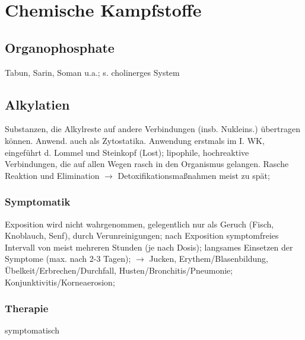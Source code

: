 \documentclass[10pt,a4paper]{report}
\begin{document}
\section{Chemische Kampfstoffe} %
\label{sec:chemische_kampfstoffe}
\subsection{Organophosphate} %
\label{sub:organophosphate}
Tabun, Sarin, Soman u.a.; s. cholinerges System
\subsection{Alkylatien} %
\label{sub:alkylatien}
Substanzen, die Alkylreste auf andere Verbindungen (insb. Nukleins.) übertragen können. Anwend. auch als Zytostatika. Anwendung erstmals im I. WK, eingeführt d. Lommel und Steinkopf (Lost); lipophile, hochreaktive Verbindungen, die auf  allen Wegen rasch in den Organismus gelangen. Rasche Reaktion und Elimination $\rightarrow$ Detoxifikationsmaßnahmen meist zu spät;
\subsubsection{Symptomatik} %
\label{ssub:symptomatik}
Exposition wird nicht wahrgenommen, gelegentlich nur als Geruch (Fisch, Knoblauch, Senf), durch Verunreinigungen; nach Exposition symptomfreies Intervall von meist mehreren Stunden (je nach Dosis); langsames Einsetzen der Symptome (max. nach 2-3 Tagen); $\rightarrow$ Jucken, Erythem/Blasenbildung, Übelkeit/Erbrechen/Durchfall, Husten/Bronchitis/Pneumonie; Konjunktivitis/Korneaerosion;
\subsubsection{Therapie} %
\label{ssub:therapie}
symptomatisch
\end{document}
